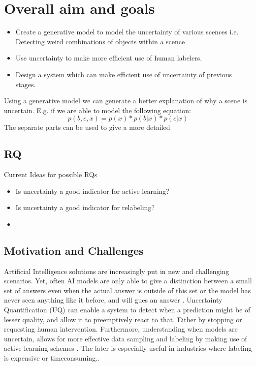 \section{Overall aim and goals}\label{sec:goals}
\begin{itemize}
    \item Create a generative model to model the uncertainty of various scences
          \subitem i.e. Detecting weird combinations of objects within a scence
    \item Use uncertainty to make more efficient use of human labelers.
    \item Design a system which can make efficient use of uncertainty of previous stages.
\end{itemize}

Using a generative model we can generate a better explanation of why a scene is uncertain. E.g. if we are able to model the following equation:
\begin{equation}
    p(b, c, x) = p(x) * p(b | x) * p(c | x)
\end{equation}
The separate parts can be used to give a more detailed


\subsection{RQ}
Current Ideas for possible RQs

\begin{itemize}
    \item Is uncertainty a good indicator for active learning?
    \item Is uncertainty a good indicator for relabeling?
    \item
\end{itemize}

\subsection{Motivation and Challenges}

Artificial Intelligence solutions are increasingly put in new and challenging scenarios. Yet, often AI models are only able to give a distinction between a small set of answers even when the actual answer is outside of this set  or the model has never seen anything like it before, and will gues an answer . Uncertainty Quantification (UQ) can enable a system to detect when a prediction might be of lesser quality, and allow it to preemptively react to that. Either by stopping or requesting human intervention. Furthermore, understanding when models are uncertain, allows for more effective data sampling and labeling by making use of active learning schemes . The later is especially useful in industries where labeling is expensive or timeconsuming..

